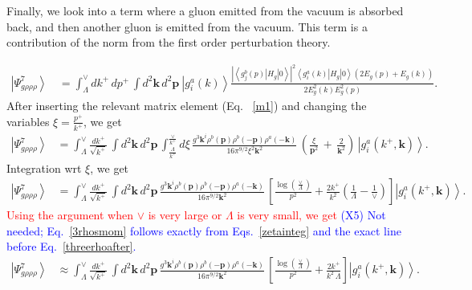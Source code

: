 \documentclass[aps,prd,amsmath,amssymb,nofootinbib]{revtex4-2}
\numberwithin{equation}{section}
\begin{document}
Finally, we look into a term where a gluon emitted from the vacuum is absorbed back, and then another gluon is emitted from the vacuum. This term is a contribution of the norm from the first order perturbation theory.
\begin{figure}[h]
    \label{fig:3}
\end{figure}
\begin{align}\label{degen}
\left|\Psi_{g\rho\rho\rho}^{7}\right\rangle \, & = \int_{\Lambda}^{\vee}dk^{+}\, dp^{+}\,\int d^{2}\mathbf{k}\, d^{2}\mathbf{p}\:\left|g_{i}^{a}(k)\right\rangle \frac{\left|\left\langle g_{j}^{b}(p)\left|H_{g}\right|0\right\rangle \right|^{2}\left\langle g_{i}^{a}(k)\left|H_{g}\right|0\right\rangle (2E_{g}(p)+E_{g}(k))}{2E_{g}^{2}(k)E_{g}^{2}(p)}.
\end{align}
After inserting the relevant matrix element (Eq.~ \eqref{m1}) and changing the variables $\xi = \frac{p^{+}}{k^{+}}$, we get
\begin{align} \label{virtual}
  \left|\Psi_{g\rho\rho\rho}^{7}\right\rangle & =\int_{\Lambda}^{\vee}\frac{dk^{+}}{\sqrt{k^{+}}}\,\int d^{2}\mathbf{k}\, d^{2}\mathbf{p}\,\int_{\frac{\Lambda}{k^{+}}}^{\frac{\vee}{k^{+}}}d\xi\,\frac{g^{3}\mathbf{k}^{i}\rho^{b}(\mathbf{p})\rho^{b}(-\mathbf{p})\rho^{a}(-\mathbf{k})}{16\pi^{9/2}\xi^{2}\mathbf{k}^{2}}\,\left(\frac{\xi}{\mathbf{p}^{2}}\,+\,\frac{2}{\mathbf{k}^{2}}\right)\,\left|g_{i}^{a}(k^{+},\mathbf{k})\right\rangle.
\end{align}
Integration wrt $\xi$, we get
\begin{align} \label{zetainteg}
  \left|\Psi_{g\rho\rho\rho}^{7}\right\rangle & =\int_{\Lambda}^{\vee}\frac{dk^{+}}{\sqrt{k^{+}}}\,\int d^{2}\mathbf{k}\, d^{2}\mathbf{p}\,\frac{g^{3}\mathbf{k}^{i}\rho^{b}(\mathbf{p})\rho^{b}(-\mathbf{p})\rho^{a}(-\mathbf{k})}{16\pi^{9/2}\mathbf{k}^{2}}\,\left[\frac{\log{\left(\frac{\vee}{\Lambda}\right)}}{p^{2}}+\frac{2k^{+}}{k^{2}}\left(\frac{1}{\Lambda} - \frac{1}{\vee}\right)\right]\left|g_{i}^{a}(k^{+},\mathbf{k})\right\rangle. 
\end{align}
\textcolor{red}{Using the argument when $\vee$ is very large or $\Lambda$ is very small, we get} \textcolor{blue}{(X5) Not needed; Eq.~\eqref{3rhosmom} follows exactly from Eqs.~\eqref{zetainteg} and the exact line before Eq.~\eqref{threerhoafter}.}
\begin{align}
     \left|\Psi_{g\rho\rho\rho}^{7}\right\rangle & \approx \int_{\Lambda}^{\vee}\frac{dk^{+}}{\sqrt{k^{+}}}\,\int d^{2}\mathbf{k}\, d^{2}\mathbf{p}\,\frac{g^{3}\mathbf{k}^{i}\rho^{b}(\mathbf{p})\rho^{b}(-\mathbf{p})\rho^{a}(-\mathbf{k})}{16\pi^{9/2}\mathbf{k}^{2}}\,\left[\frac{\log{\left(\frac{\vee}{\Lambda}\right)}}{p^{2}}+\frac{2k^{+}}{k^{2}\,\Lambda}\right]\left|g_{i}^{a}(k^{+},\mathbf{k})\right\rangle. 
\end{align}
\end{document}
